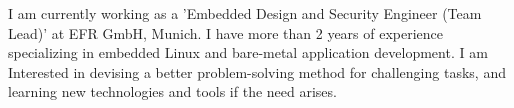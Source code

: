

\begin{cvparagraph}

I am currently working as a 'Embedded Design and Security Engineer (Team Lead)' at EFR GmbH, Munich. I have more than 2 years of experience specializing in embedded Linux and bare-metal application development. I am Interested in devising a better problem-solving method for challenging tasks, and learning new technologies and tools if the need arises. 
\end{cvparagraph}
